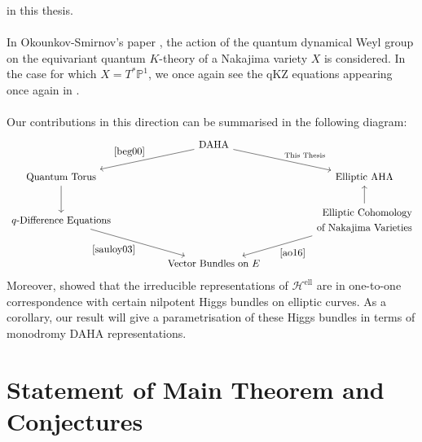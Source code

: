 \documentclass[a4paper]{report}
\theoremstyle{theorem}
\theoremstyle{definition}
\theoremstyle{remark}
\theoremstyle{proposition}
\theoremstyle{conjecture}
\theoremstyle{lemma}
\theoremstyle{corollary}
\theoremstyle{exercise}
\theoremstyle{example}
\newcommand{\mcal}{\mathcal}
\newcommand{\on}{\operatorname}
\begin{document}
  in this thesis.\\\\ 
  In Okounkov-Smirnov's paper \cite{os22}, the action of the quantum dynamical Weyl group on the equivariant quantum $K$-theory of a Nakajima variety $X$
  is considered. In the case for which $X = T^\ast\mathbb{P}^1$, we once again see the qKZ equations appearing once again 
  in \cite[(122)]{os22}.\\\\ 
  Our contributions in this direction can be summarised in the following diagram:
  $$\begin{tikzcd}
                                                                  &  & \text{DAHA} \arrow[rrd, "\text{This Thesis}"] \arrow[lld, "\cite{beg00}"'] &  &                                                                                     \\
  \text{Quantum Torus} \arrow[d]                                  &  &                                                                                                   &  & \text{Elliptic AHA}                                                                 \\
  \text{$q$-Difference Equations} \arrow[rrd, "\cite{sauloy03}"'] &  &                                                                                                   &  & \begin{aligned}
      \text{Elliptic Cohomology}\\
      \text{of Nakajima Varieties}
  \end{aligned}\arrow[lld, "\cite{ao16}"] \arrow[u] \\
                                                                  &  & \text{Vector Bundles on $E$}                                                                      &  &                                                                                    
  \end{tikzcd}$$
  Moreover, \cite{ZZ21} showed that the irreducible representations of $\mcal{H}^{\on{ell}}$ 
  are in one-to-one correspondence with certain nilpotent Higgs bundles on elliptic curves. 
  As a corollary, our result will give a parametrisation of these Higgs bundles in terms of 
  monodromy DAHA representations.
  
  \section*{Statement of Main Theorem and Conjectures}
  
\end{document}
